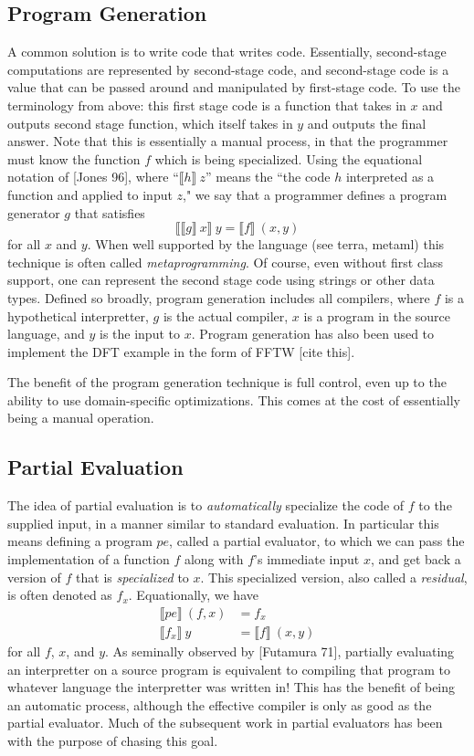 \documentclass{article}
\begin{document}
\subsection {Program Generation} 
A common solution is to write code that writes code.  Essentially, second-stage computations are represented by second-stage code, and second-stage code is a value that can be passed around and manipulated by first-stage code.  To use the terminology from above: this first stage code is a function that takes in $x$ and outputs second stage function, which itself takes in $y$ and outputs the final answer. Note that this is essentially a manual process, in that the programmer must know the function $f$ which is being specialized.  Using the equational notation of [Jones 96], where ``$\llbracket h \rrbracket~z$'' means the ``the code $h$ interpreted as a function and applied to input $z$," we say that a programmer defines a program generator $g$ that satisfies 
\[
\llbracket \llbracket g \rrbracket~x\rrbracket~y =\llbracket f \rrbracket~(x,y)
\] 
for all $x$ and $y$. When well supported by the language (see terra, metaml) this technique is often called {\em metaprogramming}.  Of course, even without first class support, one can represent the second stage code using strings or other data types.  Defined so broadly, program generation includes all compilers, where $f$ is a hypothetical interpretter, $g$ is the actual compiler, $x$ is a program in the source language, and $y$ is the input to $x$.  Program generation has also been used to implement the DFT example in the form of FFTW [cite this].  

The benefit of the program generation technique is full control, even up to the ability to use domain-specific optimizations.  This comes at the cost of essentially being a manual operation.  

\subsection {Partial Evaluation} 
The idea of partial evaluation is to {\em automatically} specialize the code of $f$ to the supplied input, in a manner similar to standard evaluation.  In particular this means defining a program $pe$, called a partial evaluator, to which we can pass the implementation of a function $f$ along with $f$'s immediate input $x$, and get back a version of $f$ that is {\em specialized} to $x$.  This specialized version, also called a {\em residual}, is often denoted as $f_x$.  Equationally, we have
\begin{align*}
\llbracket pe\rrbracket~(f,x) &= f_x \\
\llbracket f_x\rrbracket~y &= \llbracket f\rrbracket~(x,y)
\end{align*}
 for all $f$, $x$, and $y$.  As seminally observed by [Futamura 71], partially evaluating an interpretter on a source program is equivalent to compiling that program to whatever language the interpretter was written in!  This has the benefit of being an automatic process, although the effective compiler is only as good as the partial evaluator.  Much of the subsequent work in partial evaluators has been with the purpose of chasing this goal.
\end{document}
